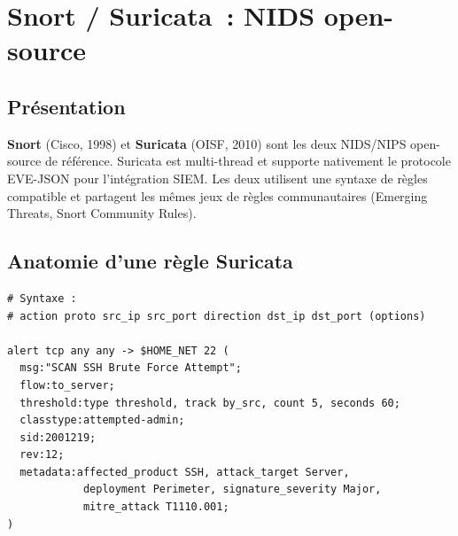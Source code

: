 \section{Snort / Suricata~: NIDS open-source}
\label{sec:snort-suricata}

\subsection{Présentation}

\textbf{Snort} (Cisco, 1998) et \textbf{Suricata} (OISF, 2010) sont les deux
NIDS/NIPS open-source de référence. Suricata est multi-thread et supporte
nativement le protocole EVE-JSON pour l'intégration SIEM. Les deux utilisent
une syntaxe de règles compatible et partagent les mêmes jeux de règles
communautaires (Emerging Threats, Snort Community Rules).

\subsection{Anatomie d'une règle Suricata}

\begin{lstlisting}[style=StyleCode,
  caption={Anatomie d'une règle Suricata},
  label={lst:suricata-rule}]
# Syntaxe :
# action proto src_ip src_port direction dst_ip dst_port (options)

alert tcp any any -> $HOME_NET 22 (
  msg:"SCAN SSH Brute Force Attempt";
  flow:to_server;
  threshold:type threshold, track by_src, count 5, seconds 60;
  classtype:attempted-admin;
  sid:2001219;
  rev:12;
  metadata:affected_product SSH, attack_target Server,
            deployment Perimeter, signature_severity Major,
            mitre_attack T1110.001;
)
\end{lstlisting}

